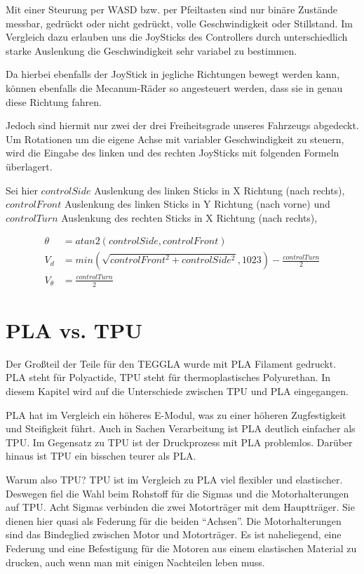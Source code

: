Mit einer Steurung per WASD bzw. per Pfeiltasten sind nur binäre Zustände messbar, gedrückt oder nicht gedrückt, volle Geschwindigkeit oder Stillstand.
Im Vergleich dazu erlauben uns die JoySticks des Controllers durch unterschiedlich starke Auslenkung die Geschwindigkeit sehr variabel zu bestimmen.

Da hierbei ebenfalls der JoyStick in jegliche Richtungen bewegt werden kann, können ebenfalls die Mecanum-Räder so angesteuert werden, dass sie in genau diese Richtung fahren.

Jedoch sind hiermit nur zwei der drei Freiheitsgrade unseres Fahrzeugs abgedeckt. Um Rotationen um die eigene Achse mit variabler Geschwindigkeit zu steuern, wird die Eingabe des linken und des rechten JoySticks mit folgenden Formeln überlagert.

\bigskip
Sei hier $controlSide$ Auslenkung des linken Sticks in X Richtung (nach rechts), 
$controlFront$ Auslenkung des linken Sticks in Y Richtung (nach vorne) und 
$controlTurn$ Auslenkung des rechten Sticks in X Richtung (nach rechts), 

\begin{align}
	\theta &= atan2(controlSide, controlFront)\\
	V_d &= min(\sqrt{controlFront^2 + controlSide^2}, 1023) - \frac{controlTurn}{2}\\
	V_\theta &= \frac{controlTurn}{2}
\end{align}


\section{PLA vs. TPU}
Der Großteil der Teile für den TEGGLA wurde mit PLA Filament gedruckt. 
PLA steht für Polyactide, TPU steht für thermoplastisches Polyurethan. 
In diesem Kapitel wird auf die Unterschiede zwischen TPU und PLA eingegangen. 

PLA hat im Vergleich ein höheres E-Modul, was zu einer höheren Zugfestigkeit und Steifigkeit führt. 
Auch in Sachen Verarbeitung ist PLA deutlich einfacher als TPU. 
Im Gegensatz zu TPU ist der Druckprozess mit PLA problemlos. 
Darüber hinaus ist TPU ein bisschen teurer als PLA. 

Warum also TPU? TPU ist im Vergleich zu PLA viel flexibler und elastischer. 
Deswegen fiel die Wahl beim Rohstoff für die Sigmas und die Motorhalterungen auf TPU. 
Acht Sigmas verbinden die zwei Motorträger mit dem Hauptträger. 
Sie dienen hier quasi als Federung für die beiden ``Achsen''. 
Die Motorhalterungen sind das Bindeglied zwischen Motor und Motorträger. 
Es ist naheliegend, eine Federung und eine Befestigung für die Motoren aus einem elastischen Material zu drucken, auch wenn man mit einigen Nachteilen leben muss.

